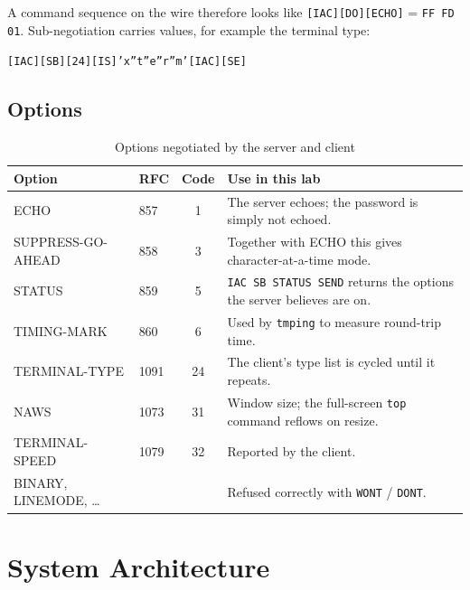 \documentclass[11pt,a4paper]{article}
\begin{document}
A command sequence on the wire therefore looks like \texttt{[IAC][DO][ECHO]} = \texttt{FF FD 01}. Sub-negotiation carries values, for example the terminal type:
\begin{center}\texttt{[IAC][SB][24][IS]'x''t''e''r''m'[IAC][SE]}\end{center}

\subsection{Options}
\begin{table}[H]
\centering
\caption{Options negotiated by the server and client}
\small
\begin{tabularx}{\textwidth}{@{}llcY@{}}
\toprule
\textbf{Option} & \textbf{RFC} & \textbf{Code} & \textbf{Use in this lab} \\ \midrule
ECHO & 857 & 1 & The server echoes; the password is simply not echoed. \\
SUPPRESS-GO-AHEAD & 858 & 3 & Together with ECHO this gives character-at-a-time mode. \\
STATUS & 859 & 5 & \texttt{IAC SB STATUS SEND} returns the options the server believes are on. \\
TIMING-MARK & 860 & 6 & Used by \texttt{tmping} to measure round-trip time. \\
TERMINAL-TYPE & 1091 & 24 & The client's type list is cycled until it repeats. \\
NAWS & 1073 & 31 & Window size; the full-screen \texttt{top} command reflows on resize. \\
TERMINAL-SPEED & 1079 & 32 & Reported by the client. \\
BINARY, LINEMODE, \ldots & & & Refused correctly with \texttt{WONT} / \texttt{DONT}. \\ \bottomrule
\end{tabularx}
\end{table}

\section{System Architecture}
\end{document}
